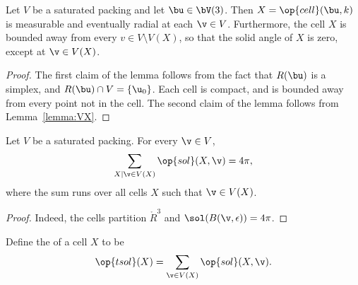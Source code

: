 \begin{lemma}\label{lemma:cell-radial}
  Let $V$ be a saturated packing and let $\bu\in \bV(3)$.  Then
  $X=\op{cell}(\bu,k)$ is measurable and eventually radial at each
  $\v\in V$.  Furthermore, the cell $X$ is bounded away from every
  $v\in V\setminus V(X)$, so that the solid angle of $X$ is zero, except
  at $\v\in V(X)$.
\end{lemma}

\begin{proof} The first claim of the
 lemma follows from the fact that $R(\bu)$ is a
  simplex, and $R(\bu)\cap V = \{\u_0\}$.
Each cell is compact, and is bounded away from every point not in
the cell.  The second claim of the lemma follows from Lemma~\ref{lemma:VX}.
\end{proof}



\begin{lemma}
Let $V$ be a saturated packing.  For every $\v\in V$, 
\[
\sum_{X\mid \v\in V(X)}  \op{sol}(X,\v) = 4\pi,
\]
where the sum runs over all cells $X$ such that $\v\in V(X)$.
\end{lemma}

\begin{proof} Indeed, the cells partition $\ring{R}^3$ and
  $\sol(B(\v,\epsilon)) = 4\pi$.
\end{proof}

\begin{definition}[$\op{tsol}$] 
  Define
  the  of a cell $X$ to be
\[  
\op{tsol}(X) = \sum_{\v \in V(X) } \op{sol}(X,\v).
\] 
\end{definition}
%
%
%

